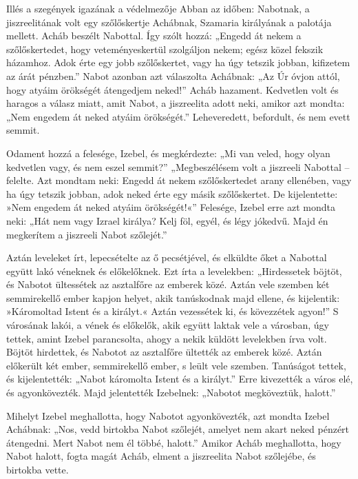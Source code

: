\documentclass[twoside]{article}
\begin{document}
\begin{lectio}{Illés a szegények igazának a védelmezője}
\noindent Abban az időben: Nabotnak, a jiszreelitának volt egy szőlőskertje Achábnak, Szamaria királyának a palotája mellett. Acháb beszélt Nabottal. Így szólt hozzá: „Engedd át nekem a szőlőskertedet, hogy veteményeskertül szolgáljon nekem; egész közel fekszik házamhoz. Adok érte egy jobb szőlőskertet, vagy ha úgy tetszik jobban, kifizetem az árát pénzben.” Nabot azonban azt válaszolta Achábnak: „Az Úr óvjon attól, hogy atyáim örökségét átengedjem neked!” Acháb hazament. Kedvetlen volt és haragos a válasz miatt, amit Nabot, a jiszreelita adott neki, amikor azt mondta: „Nem engedem át neked atyáim örökségét.” Leheveredett, befordult, és nem evett semmit.

Odament hozzá a felesége, Izebel, és megkérdezte: „Mi van veled, hogy olyan kedvetlen vagy, és nem eszel semmit?” „Megbeszélésem volt a jiszreeli Nabottal – felelte. Azt mondtam neki: Engedd át nekem szőlőskertedet arany ellenében, vagy ha úgy tetszik jobban, adok neked érte egy másik szőlőskertet. De kijelentette: »Nem engedem át neked atyáim örökségét!«” Felesége, Izebel erre azt mondta neki: „Hát nem vagy Izrael királya? Kelj föl, egyél, és légy jókedvű. Majd én megkerítem a jiszreeli Nabot szőlejét.”

Aztán leveleket írt, lepecsételte az ő pecsétjével, és elküldte őket a Nabottal együtt lakó véneknek és előkelőknek. Ezt írta a levelekben: „Hirdessetek böjtöt, és Nabotot ültessétek az asztalfőre az emberek közé. Aztán vele szemben két semmirekellő ember kapjon helyet, akik tanúskodnak majd ellene, és kijelentik: »Káromoltad Istent és a királyt.« Aztán vezessétek ki, és kövezzétek agyon!” S városának lakói, a vének és előkelők, akik együtt laktak vele a városban, úgy tettek, amint Izebel parancsolta, ahogy a nekik küldött levelekben írva volt. Böjtöt hirdettek, és Nabotot az asztalfőre ültették az emberek közé. Aztán előkerült két ember, semmirekellő ember, s leült vele szemben. Tanúságot tettek, és kijelentették: „Nabot káromolta Istent és a királyt.” Erre kivezették a város elé, és agyonkövezték. Majd jelentették Izebelnek: „Nabotot megköveztük, halott.”

Mihelyt Izebel meghallotta, hogy Nabotot agyonkövezték, azt mondta Izebel Achábnak: „Nos, vedd birtokba Nabot szőlejét, amelyet nem akart neked pénzért átengedni. Mert Nabot nem él többé, halott.” Amikor Acháb meghallotta, hogy Nabot halott, fogta magát Acháb, elment a jiszreelita Nabot szőlejébe, és birtokba vette.


\end{lectio}
\end{document}
